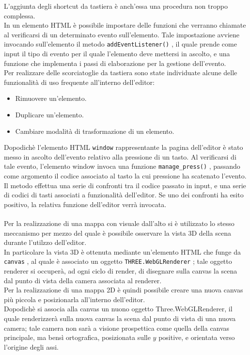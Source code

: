 L’aggiunta degli shortcut da tastiera è anch’essa una procedura non troppo complessa. 
\\
In un elemento HTML è possibile impostare delle funzioni che verranno chiamate al verificarsi di un determinato evento sull’elemento. Tale impostazione avviene invocando sull’elemento il metodo \texttt{addEventListener()} , il quale prende come input il tipo di evento per il quale l’elemento deve mettersi in ascolto, e una funzione che implementa i passi di elaborazione per la gestione dell’evento.
\\
Per realizzare delle scorciatoglie da tastiera sono state individuate alcune delle funzionalità di uso frequente all’interno dell’editor:
\begin{itemize}
\item Rimuovere un’elemento.
\item Duplicare un’elemento.
\item Cambiare modalità di trasformazione di un elemento.
\end{itemize}
Dopodichè l’elemento HTML \texttt{window} rappresentante la pagina dell’editor è stato messo in ascolto dell’evento relativo alla pressione di un tasto. Al verificarsi di tale evento, l’elemento window invoca una funzione \texttt{manage\_press()} , passando come argomento il codice associato al tasto la cui pressione ha scatenato l’evento. Il metodo effettua una serie di confronti tra il codice passato in input, e una serie di codici di tasti associati a funzionalità dell’editor. Se uno dei confronti ha esito positivo, la relativa funzione dell’editor verrà invocata.
\\
\\
Per la realizzazione di una mappa con visuale dall’alto si è utilizzato lo stesso meccanismo per mezzo del quale è possibile osservare la vista 3D della scena durante l’utilzzo dell’editor.
\\
In particolare la vista 3D è ottenuta mediante un'elemento HTML che funge da \texttt{canvas} , al quale è associato un oggetto \texttt{THREE.WebGLRenderer} ; tale oggetto renderer si occuperà, ad ogni ciclo di render, di disegnare sulla canvas la scena dal punto di vista della camera associata al renderer.
\\
Per la realizzazione di una mappa 2D è quindi possibile creare una nuova canvas più piccola e posizionarla all’interno dell’editor.
\\ 
Dopodichè si associa alla canvas un nuono oggetto Three.WebGLRenderer, il quale renderizzerà sulla nuova canvas la scena dal punto di vista di una nuova camera; tale camera non sarà a visione prospettica come quella della canvas principale, ma bensì ortografica, posizionata sulle $y$ positive, e orientata verso l’origine degli assi.
